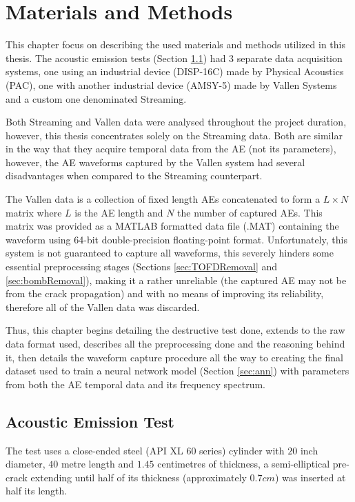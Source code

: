 \chapter{Materials and Methods}

This chapter focus on describing the used materials and methods utilized in this thesis. The acoustic emission tests (Section \ref{sec:AETest}) had 3 separate data acquisition systems, one using an industrial device (DISP-16C) made by Physical Acoustics (PAC), one with another industrial device (AMSY-5) made by Vallen Systems and a custom one denominated Streaming.

Both Streaming and Vallen data were analysed throughout the project duration, however, this thesis concentrates solely on the Streaming data. Both are similar in the way that they acquire temporal data from the AE (not its parameters), however, the AE waveforms captured by the Vallen system had several disadvantages when compared to the Streaming counterpart.

The Vallen data is a collection of fixed length AEs concatenated to form a $L \times N$ matrix where $L$ is the AE length and $N$ the number of captured AEs. This matrix was provided as a MATLAB formatted data file (.MAT) containing the waveform using 64-bit double-precision floating-point format. Unfortunately, this system is not guaranteed to capture all waveforms, this severely hinders some essential preprocessing stages (Sections \ref{sec:TOFDRemoval} and \ref{sec:bombRemoval}), making it a rather unreliable (the captured AE may not be from the crack propagation) and with no means of improving its reliability, therefore all of the Vallen data was discarded.

Thus, this chapter begins detailing the destructive test done, extends to the raw data format used, describes all the preprocessing done and the reasoning behind it, then details the waveform capture procedure all the way to creating the final dataset used to train a neural network model (Section \ref{sec:ann}) with parameters from both the AE temporal data and its frequency spectrum.


\section{Acoustic Emission Test} \label{sec:AETest}

The test uses a close-ended steel (API XL 60 series) cylinder with $20$ inch diameter, $40$ metre length and $1.45$ centimetres of thickness, a semi-elliptical pre-crack extending until half of its thickness (approximately $0.7 cm$) was inserted at half its length.

